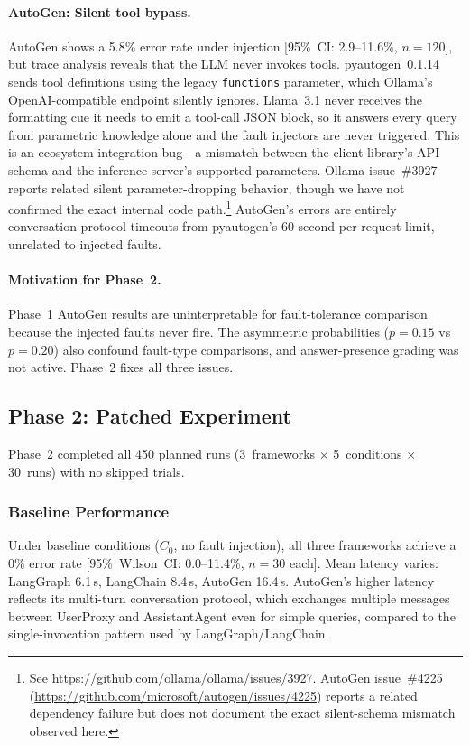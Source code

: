 \documentclass[make,article,submit,moreauthors,pdftex]{mdpi}
\begin{document}
\paragraph{AutoGen: Silent tool bypass.} AutoGen shows a 5.8\% error rate under injection [95\%~CI: 2.9--11.6\%, $n = 120$], but trace analysis reveals that the LLM never invokes tools. pyautogen~0.1.14 sends tool definitions using the legacy \texttt{functions} parameter, which Ollama's OpenAI-compatible endpoint silently ignores. Llama~3.1 never receives the formatting cue it needs to emit a tool-call JSON block, so it answers every query from parametric knowledge alone and the fault injectors are never triggered. This is an ecosystem integration bug---a mismatch between the client library's API schema and the inference server's supported parameters. Ollama issue~\#3927 reports related silent parameter-dropping behavior, though we have not confirmed the exact internal code path.\footnote{See \url{https://github.com/ollama/ollama/issues/3927}. AutoGen issue~\#4225 (\url{https://github.com/microsoft/autogen/issues/4225}) reports a related dependency failure but does not document the exact silent-schema mismatch observed here.} AutoGen's errors are entirely conversation-protocol timeouts from pyautogen's 60-second per-request limit, unrelated to injected faults.

\paragraph{Motivation for Phase~2.} Phase~1 AutoGen results are uninterpretable for fault-tolerance comparison because the injected faults never fire. The asymmetric probabilities ($p = 0.15$ vs $p = 0.20$) also confound fault-type comparisons, and answer-presence grading was not active. Phase~2 fixes all three issues.


\subsection{Phase 2: Patched Experiment}\label{sec:phase2-results}

Phase~2 completed all 450 planned runs (3~frameworks $\times$ 5~conditions $\times$ 30~runs) with no skipped trials.

\subsubsection{Baseline Performance}

Under baseline conditions ($C_0$, no fault injection), all three frameworks achieve a 0\% error rate [95\%~Wilson~CI: 0.0--11.4\%, $n = 30$ each]. Mean latency varies: LangGraph 6.1\,s, LangChain 8.4\,s, AutoGen 16.4\,s. AutoGen's higher latency reflects its multi-turn conversation protocol, which exchanges multiple messages between UserProxy and AssistantAgent even for simple queries, compared to the single-invocation pattern used by LangGraph/LangChain.
\end{document}
